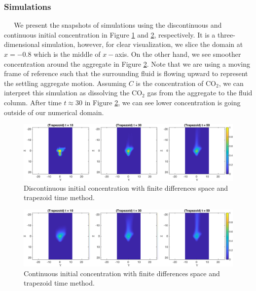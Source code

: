 \subsubsection{Simulations}
$\ \ \ \ \ $  
We present the snapshots of simulations using the discontinuous and continuous initial concentration in Figure \ref{fig_ic4_trap_snap} and \ref{fig_icG_trap_snap}, respectively. It is a three-dimensional simulation, however, for clear visualization, we slice the domain at $x= -0.8$ which is the middle of $x-$axis.
On the other hand, we see smoother concentration around the aggregate in Figure \ref{fig_icG_trap_snap}. Note that we are using a moving frame of reference such that the surrounding fluid is flowing upward to represent the settling aggregate motion. Assuming $C$ is the concentration of CO$_2$, we can interpret this simulation as dissolving the CO$_2$ gas from the aggregate to the fluid column. 
After time $t \approx 30$ in Figure \ref{fig_icG_trap_snap}, we can see lower concentration is going outside of our numerical domain.  
 \begin{figure}[h]
 \begin{center}
	\includegraphics[scale=0.7]{./figures/fig_ic4_Trap_snap135}
 \end{center}
 \caption{Discontinuous initial concentration with finite differences space and trapezoid time method.}
 \label{fig_ic4_trap_snap}
 \end{figure}
 \begin{figure}[h]
 \begin{center}
	\includegraphics[scale=0.7]{./figures/fig_icG_Trap_snap135}
 \end{center}
 \caption{Continuous initial concentration with finite differences space and trapezoid time method.}
 \label{fig_icG_trap_snap}
 \end{figure}
